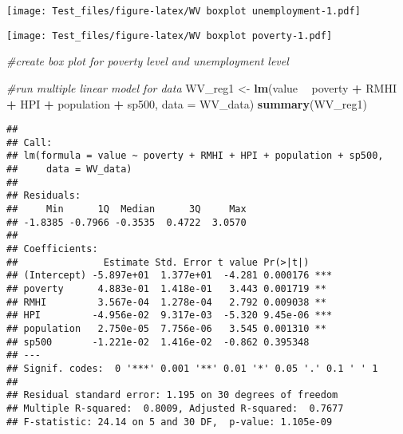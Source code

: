 \documentclass[
]{article}
\newenvironment{Shaded}{\begin{snugshade}}{\end{snugshade}}
\newcommand{\CommentTok}[1]{\textcolor[rgb]{0.56,0.35,0.01}{\textit{#1}}}
\newcommand{\DataTypeTok}[1]{\textcolor[rgb]{0.13,0.29,0.53}{#1}}
\newcommand{\KeywordTok}[1]{\textcolor[rgb]{0.13,0.29,0.53}{\textbf{#1}}}
\newcommand{\NormalTok}[1]{#1}
\newcommand{\OperatorTok}[1]{\textcolor[rgb]{0.81,0.36,0.00}{\textbf{#1}}}
\newcommand{\StringTok}[1]{\textcolor[rgb]{0.31,0.60,0.02}{#1}}
\begin{document}
\texttt{[image: Test\_files/figure-latex/WV boxplot unemployment-1.pdf]}

\begin{Shaded}
\end{Shaded}

\texttt{[image: Test\_files/figure-latex/WV boxplot poverty-1.pdf]}

\begin{Shaded}
\begin{Highlighting}[]
\CommentTok{#create box plot for poverty level and unemployment level}
\end{Highlighting}
\end{Shaded}

\begin{Shaded}
\begin{Highlighting}[]
\CommentTok{#run multiple linear model for data}
\NormalTok{WV_reg1 <-}\StringTok{ }\KeywordTok{lm}\NormalTok{(value }\OperatorTok{~}\StringTok{ }\NormalTok{poverty }\OperatorTok{+}\StringTok{ }\NormalTok{RMHI }\OperatorTok{+}\StringTok{ }\NormalTok{HPI }\OperatorTok{+}\StringTok{ }\NormalTok{population }\OperatorTok{+}\StringTok{ }\NormalTok{sp500, }\DataTypeTok{data =}\NormalTok{ WV_data)}
\KeywordTok{summary}\NormalTok{(WV_reg1)}
\end{Highlighting}
\end{Shaded}

\begin{verbatim}
## 
## Call:
## lm(formula = value ~ poverty + RMHI + HPI + population + sp500, 
##     data = WV_data)
## 
## Residuals:
##     Min      1Q  Median      3Q     Max 
## -1.8385 -0.7966 -0.3535  0.4722  3.0570 
## 
## Coefficients:
##               Estimate Std. Error t value Pr(>|t|)    
## (Intercept) -5.897e+01  1.377e+01  -4.281 0.000176 ***
## poverty      4.883e-01  1.418e-01   3.443 0.001719 ** 
## RMHI         3.567e-04  1.278e-04   2.792 0.009038 ** 
## HPI         -4.956e-02  9.317e-03  -5.320 9.45e-06 ***
## population   2.750e-05  7.756e-06   3.545 0.001310 ** 
## sp500       -1.221e-02  1.416e-02  -0.862 0.395348    
## ---
## Signif. codes:  0 '***' 0.001 '**' 0.01 '*' 0.05 '.' 0.1 ' ' 1
## 
## Residual standard error: 1.195 on 30 degrees of freedom
## Multiple R-squared:  0.8009, Adjusted R-squared:  0.7677 
## F-statistic: 24.14 on 5 and 30 DF,  p-value: 1.105e-09
\end{verbatim}
\end{document}
